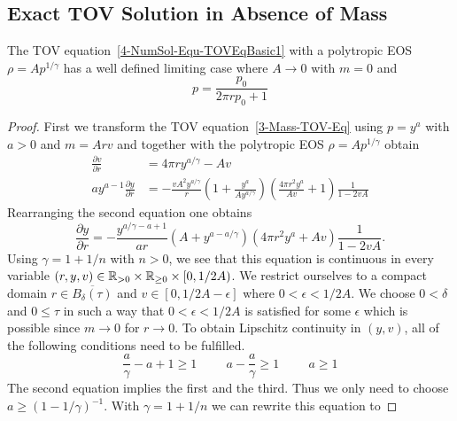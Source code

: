 \begin{appendix}
\begin{section}
\subsection{Exact TOV Solution in Absence of Mass}
\begin{theorem}
	The TOV equation~\ref{4-NumSol-Equ-TOVEqBasic1} with a polytropic EOS $\rho=Ap^{1/\gamma}$ has a well defined limiting case where $A\rightarrow0$ with $m=0$ and
	\begin{equation}
		p = \frac{p_0}{2\pi rp_0+1}
	\end{equation}
\end{theorem}
\begin{proof}
	First we transform the TOV equation~\ref{3-Mass-TOV-Eq} using $p=y^a$ with $a>0$ and $m=Arv$ and together with the polytropic EOS $\rho=Ap^{1/\gamma}$ obtain
	\begin{align}
		\frac{\partial v}{\partial r} &= 4\pi ry^{a/\gamma}-Av\\
		ay^{a-1}\frac{\partial y}{\partial r} &= -\frac{vA^2y^{a/\gamma}}{r}\left(1+\frac{y^a}{Ay^{a/\gamma}}\right)\left(\frac{4\pi r^2y^a}{Av} +1\right)\frac{1}{1-2vA}
		\label{tmp-label-2}
	\end{align}
	Rearranging the second equation one obtains
	\begin{equation}
		\frac{\partial y}{\partial r} = -\frac{y^{a/\gamma-a+1}}{ar}\left(A+y^{a-a/\gamma}\right)\left(4\pi r^2y^a +Av\right)\frac{1}{1-2vA}.
	\end{equation}
	Using $\gamma=1+1/n$ with $n>0$, we see that this equation is continuous in every variable $(r,y,v)\in\mathbb{R}_{>0}\times\mathbb{R}_{\geq0}\times[0,1/2A)$.
	We restrict ourselves to a compact domain $r\in \overline{B_{\delta}(\tau)}$ and $v\in[0,1/2A-\epsilon]$ where $0<\epsilon<1/2A$.
	We choose $0<\delta$ and $0\leq\tau$ in such a way that $0<\epsilon<1/2A$ is satisfied for some $\epsilon$ which is possible since $m\rightarrow0$ for $r\rightarrow0$.
	To obtain Lipschitz continuity in $(y,v)$, all of the following conditions need to be fulfilled.
	\begin{equation}
		\frac{a}{\gamma}-a+1 \geq 1 \hspace{1cm} a-\frac{a}{\gamma} \geq 1 \hspace{1cm} a \geq 1
		\label{tmp-label-1}
	\end{equation}
	The second equation implies the first and the third. Thus we only need to choose $a\geq(1-1/\gamma)^{-1}$.
	With $\gamma=1+1/n$ we can rewrite this equation to

\end{proof}
\end{section}
\end{appendix}
